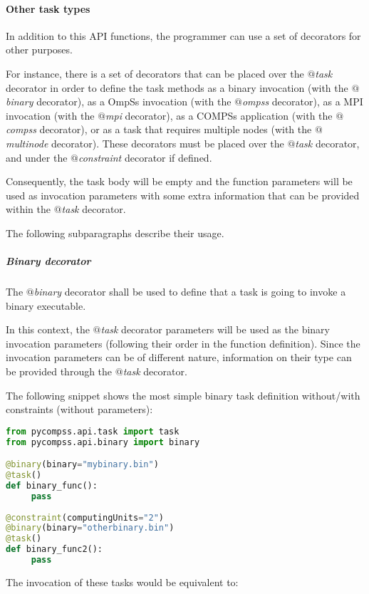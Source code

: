 \paragraph{Other task types}
\label{par:other_decorators}

In addition to this API functions, the programmer can use a set of decorators for other purposes.

For instance, there is a set of decorators that can be placed over the {\it $@$task} decorator in order to 
define the task methods as a binary invocation (with the {\it $@$binary} decorator), as a OmpSs invocation 
(with the {\it $@$ompss} decorator), as a MPI invocation (with the {\it $@$mpi} decorator), as a COMPSs application
(with the {\it $@$compss} decorator), or as a task that requires multiple nodes (with the {\it $@$multinode} decorator).
These decorators must be placed over the {\it $@$task} decorator, and under the {\it $@$constraint} decorator if 
defined.

Consequently, the task body will be empty and the function parameters will be used as invocation parameters
with some extra information that can be provided within the {\it $@$task} decorator.

The following subparagraphs describe their usage.

\subparagraph{Binary decorator}
\label{subpar:binary_decorator}

The {\it $@$binary} decorator shall be used to define that a task is going to invoke a binary executable.

In this context, the {\it $@$task} decorator parameters will be used as the binary invocation parameters
(following their order in the function definition). Since the invocation parameters can be of different nature, 
information on their type can be provided through the {\it $@$task} decorator.

The following snippet shows the most simple binary task definition without/with constraints (without parameters):

\begin{lstlisting}[language=python]
from pycompss.api.task import task
from pycompss.api.binary import binary

@binary(binary="mybinary.bin")
@task()
def binary_func():
     pass
     
@constraint(computingUnits="2")
@binary(binary="otherbinary.bin")
@task()
def binary_func2():
     pass
\end{lstlisting}

The invocation of these tasks would be equivalent to:

